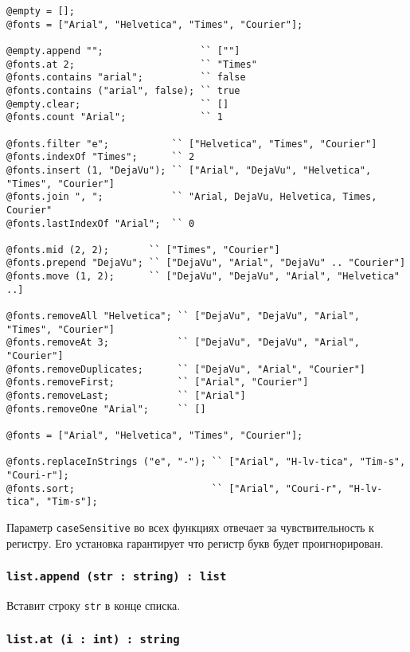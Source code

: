 \begin{sourcecode}
\label{listmethods}
\begin{verbatim}
@empty = [];
@fonts = ["Arial", "Helvetica", "Times", "Courier"];

@empty.append "";                 `` [""]
@fonts.at 2;                      `` "Times"
@fonts.contains "arial";          `` false
@fonts.contains ("arial", false); `` true
@empty.clear;                     `` []
@fonts.count "Arial";             `` 1

@fonts.filter "e";           `` ["Helvetica", "Times", "Courier"]
@fonts.indexOf "Times";      `` 2
@fonts.insert (1, "DejaVu"); `` ["Arial", "DejaVu", "Helvetica", "Times", "Courier"]
@fonts.join ", ";            `` "Arial, DejaVu, Helvetica, Times, Courier"
@fonts.lastIndexOf "Arial";  `` 0

@fonts.mid (2, 2);       `` ["Times", "Courier"]
@fonts.prepend "DejaVu"; `` ["DejaVu", "Arial", "DejaVu" .. "Courier"]
@fonts.move (1, 2);      `` ["DejaVu", "DejaVu", "Arial", "Helvetica" ..]

@fonts.removeAll "Helvetica"; `` ["DejaVu", "DejaVu", "Arial", "Times", "Courier"]
@fonts.removeAt 3;            `` ["DejaVu", "DejaVu", "Arial", "Courier"]
@fonts.removeDuplicates;      `` ["DejaVu", "Arial", "Courier"]
@fonts.removeFirst;           `` ["Arial", "Courier"]
@fonts.removeLast;            `` ["Arial"]
@fonts.removeOne "Arial";     `` []

@fonts = ["Arial", "Helvetica", "Times", "Courier"];

@fonts.replaceInStrings ("e", "-"); `` ["Arial", "H-lv-tica", "Tim-s", "Couri-r"];
@fonts.sort;                        `` ["Arial", "Couri-r", "H-lv-tica", "Tim-s"];
\end{verbatim}
\end{sourcecode}

Параметр \texttt{caseSensitive} во всех функциях отвечает за чувствительность к регистру. Его установка гарантирует что регистр букв будет проигнорирован.

\subsubsection{\texttt{list.append (str : string) : list}}

Вставит строку \texttt{str} в конце списка.

\subsubsection{\texttt{list.at (i : int) : string}}

